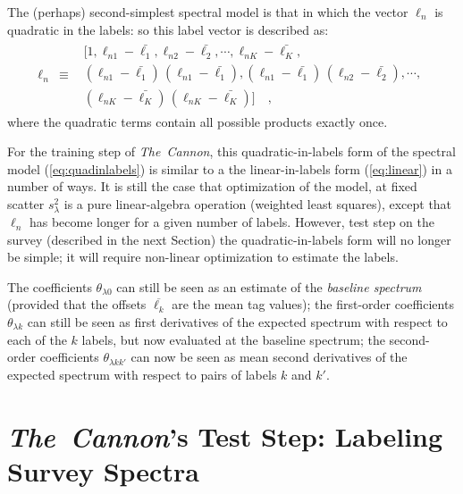 \documentclass[12pt, preprint]{aastex}
\newcommand{\tc}{\textsl{The~Cannon}}
\newcommand{\set}[1]{\bm{#1}}
\newcommand{\starlabel}{\ell}
\newcommand{\starlabelvec}{\set{\starlabel}}
\newcommand{\mean}[1]{\overline{#1}}
\begin{document}
The (perhaps) second-simplest spectral model is that in which the
vector $\starlabelvec_n$ is quadratic in the labels: so this label vector is described as:
\begin{eqnarray}
\starlabelvec_n &\equiv& \begin{array}{l}[1,
                          \starlabel_{n1} - \bar{\starlabel_1},
                          \starlabel_{n2} - \bar{\starlabel_2},
                          \cdots,
                          \starlabel_{nK} - \bar{\starlabel_K},\\
                          (\starlabel_{n1} - \bar{\starlabel_1})\,(\starlabel_{n1} - \bar{\starlabel_1}),
                          (\starlabel_{n1} - \bar{\starlabel_1})\,(\starlabel_{n2} - \bar{\starlabel_2}),
                          \cdots,\\
                          (\starlabel_{nK} - \bar{\starlabel_K})\,(\starlabel_{nK} - \bar{\starlabel_K})]\quad ,
\end{array}
\label{eq:quadinlabels}
\end{eqnarray}
where the quadratic terms contain all possible products exactly once.

For the training step of \tc , this quadratic-in-labels form of the spectral model (\ref{eq:quadinlabels}) is similar to a the linear-in-labels form (\ref{eq:linear}) in a number
of ways.
It is still the case that optimization of the model, at fixed scatter
$s_\lambda^2$ is a pure linear-algebra operation (weighted least
squares), except that $\starlabelvec_n$ has become longer for a given number of labels. 
However, test step on the survey (described in the next Section) the quadratic-in-labels form
 will no longer be simple; it will require non-linear
optimization to estimate the labels.

The coefficients $\theta_{\lambda 0}$ can still be seen as an estimate of the
\emph{baseline spectrum} (provided that the offsets $\mean{\starlabel_k}$ are the
mean tag values); the first-order coefficients $\theta_{\lambda k}$ can still
be seen as first derivatives of the expected spectrum with respect to
each of the $k$ labels, but now evaluated at the baseline spectrum; the
second-order coefficients $\theta_{\lambda kk'}$ can now be seen as mean
second derivatives of the expected spectrum with respect to pairs of
labels $k$ and $k'$.

\section{\tc's Test Step: Labeling Survey Spectra}
\label{sec:paramestimate}
\end{document}
